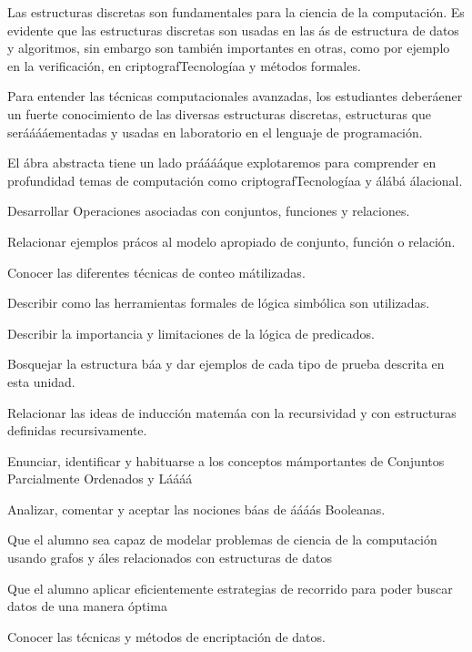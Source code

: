 \begin{syllabus}


\begin{justification}
Las estructuras discretas son fundamentales para la ciencia de la computación. Es evidente que las estructuras discretas son usadas en las ás de estructura de datos y algoritmos, sin embargo son también importantes en otras, como por ejemplo en la verificación, en criptografTecnologíaa y métodos formales.

Para entender las técnicas computacionales avanzadas, los estudiantes deberáener un fuerte conocimiento de las diversas estructuras discretas, estructuras que serááááementadas y usadas en laboratorio en el lenguaje de programación.

El ábra abstracta tiene un lado prááááque explotaremos para comprender en profundidad temas de computación como criptografTecnologíaa y álábá álacional.
\end{justification}

\begin{goals}
\item Desarrollar Operaciones asociadas con conjuntos, funciones y relaciones.
\item Relacionar ejemplos prácos al modelo apropiado de conjunto, función o relación.
\item Conocer las diferentes técnicas de conteo mátilizadas.
\item Describir como las herramientas formales de lógica simbólica son utilizadas.
\item Describir la importancia y limitaciones de la lógica de predicados.
\item Bosquejar la estructura báa y dar ejemplos de cada tipo de prueba descrita en esta unidad.
\item Relacionar las ideas de inducción matemáa con la recursividad y con estructuras definidas recursivamente.
\item Enunciar, identificar y habituarse a los conceptos mámportantes de Conjuntos Parcialmente Ordenados y Láááá
\item Analizar, comentar y aceptar las nociones báas de áááás Booleanas.
\item Que el alumno sea capaz de modelar problemas de ciencia de la computación usando grafos y áles relacionados con estructuras de datos
\item Que el alumno aplicar eficientemente estrategias de recorrido para poder buscar datos de una manera óptima
\item Conocer las técnicas y métodos de encriptación de datos.
\end{goals}


\end{syllabus}
